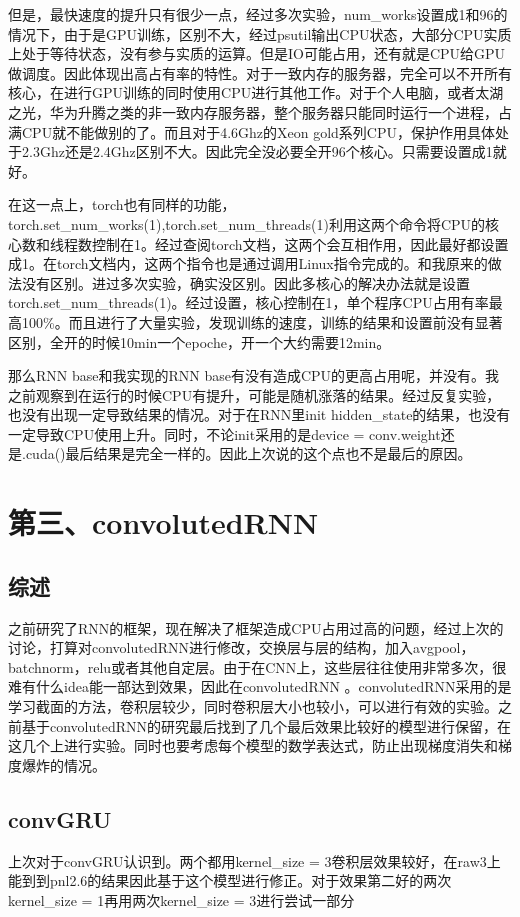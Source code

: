 \documentclass[11pt]{ctexart}
\begin{document}
但是，最快速度的提升只有很少一点，经过多次实验，num\_works设置成1和96的情况下，由于是GPU训练，区别不大，经过psutil输出CPU状态，大部分CPU实质上处于等待状态，没有参与实质的运算。但是IO可能占用，还有就是CPU给GPU做调度。因此体现出高占有率的特性。对于一致内存的服务器，完全可以不开所有核心，在进行GPU训练的同时使用CPU进行其他工作。对于个人电脑，或者太湖之光，华为升腾之类的非一致内存服务器，整个服务器只能同时运行一个进程，占满CPU就不能做别的了。而且对于4.6Ghz的Xeon gold系列CPU，保护作用具体处于2.3Ghz还是2.4Ghz区别不大。因此完全没必要全开96个核心。只需要设置成1就好。

在这一点上，torch也有同样的功能，torch.set\_num\_works(1),torch.set\_num\_threads(1)利用这两个命令将CPU的核心数和线程数控制在1。经过查阅torch文档，这两个会互相作用，因此最好都设置成1。在torch文档内，这两个指令也是通过调用Linux指令完成的。和我原来的做法没有区别。进过多次实验，确实没区别。因此多核心的解决办法就是设置torch.set\_num\_threads(1)。经过设置，核心控制在1，单个程序CPU占用有率最高100\%。而且进行了大量实验，发现训练的速度，训练的结果和设置前没有显著区别，全开的时候10min一个epoche，开一个大约需要12min。

那么RNN base和我实现的RNN base有没有造成CPU的更高占用呢，并没有。我之前观察到在运行的时候CPU有提升，可能是随机涨落的结果。经过反复实验，也没有出现一定导致结果的情况。对于在RNN里init hidden\_state的结果，也没有一定导致CPU使用上升。同时，不论init采用的是device = conv.weight还是.cuda()最后结果是完全一样的。因此上次说的这个点也不是最后的原因。


\section{第三、convolutedRNN}
\subsection{综述}
之前研究了RNN的框架，现在解决了框架造成CPU占用过高的问题，经过上次的讨论，打算对convolutedRNN进行修改，交换层与层的结构，加入avgpool，batchnorm，relu或者其他自定层。由于在CNN上，这些层往往使用非常多次，很难有什么idea能一部达到效果，因此在convolutedRNN 。convolutedRNN采用的是学习截面的方法，卷积层较少，同时卷积层大小也较小，可以进行有效的实验。之前基于convolutedRNN的研究最后找到了几个最后效果比较好的模型进行保留，在这几个上进行实验。同时也要考虑每个模型的数学表达式，防止出现梯度消失和梯度爆炸的情况。

\subsection{convGRU}
上次对于convGRU认识到。两个都用kernel\_size = 3卷积层效果较好，在raw3上能到到pnl2.6的结果因此基于这个模型进行修正。对于效果第二好的两次kernel\_size = 1再用两次kernel\_size = 3进行尝试一部分
\end{document}
